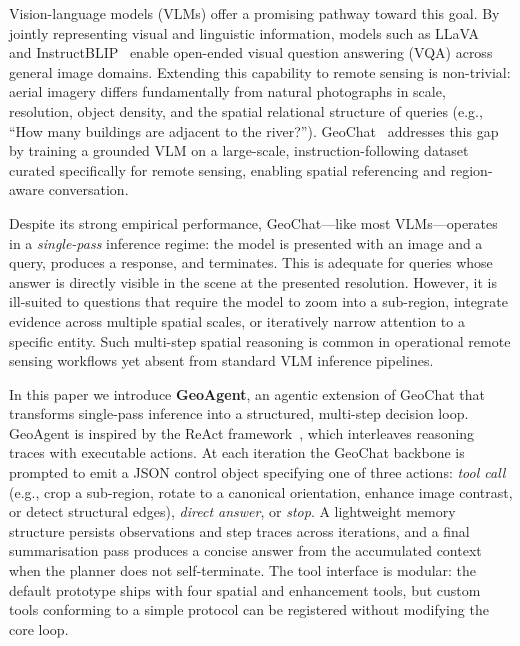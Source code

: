 \documentclass{article}
\begin{document}
Vision-language models (VLMs) offer a promising pathway toward this goal.  By
jointly representing visual and linguistic information, models such as
LLaVA~\citep{liu2023llava} and InstructBLIP~\citep{dai2023instructblip} enable
open-ended visual question answering (VQA) across general image domains.  Extending
this capability to remote sensing is non-trivial: aerial imagery differs
fundamentally from natural photographs in scale, resolution, object density, and
the spatial relational structure of queries (e.g., ``How many buildings are
adjacent to the river?'').  GeoChat~\citep{kuckreja2024geochat} addresses this gap
by training a grounded VLM on a large-scale, instruction-following dataset curated
specifically for remote sensing, enabling spatial referencing and region-aware
conversation.

Despite its strong empirical performance, GeoChat---like most VLMs---operates in a
\emph{single-pass} inference regime: the model is presented with an image and a
query, produces a response, and terminates.  This is adequate for queries whose
answer is directly visible in the scene at the presented resolution.  However, it
is ill-suited to questions that require the model to zoom into a sub-region,
integrate evidence across multiple spatial scales, or iteratively narrow attention
to a specific entity.  Such multi-step spatial reasoning is common in operational
remote sensing workflows yet absent from standard VLM inference pipelines.

In this paper we introduce \textbf{GeoAgent}, an agentic extension of GeoChat that
transforms single-pass inference into a structured, multi-step decision loop.
GeoAgent is inspired by the ReAct framework~\citep{yao2023react}, which interleaves
reasoning traces with executable actions.  At each iteration the GeoChat backbone
is prompted to emit a JSON control object specifying one of three actions:
\textit{tool call} (e.g., crop a sub-region, rotate to a canonical orientation,
enhance image contrast, or detect structural edges), \textit{direct answer}, or
\textit{stop}.  A lightweight memory structure persists observations and step traces
across iterations, and a final summarisation pass produces a concise answer from the
accumulated context when the planner does not self-terminate.  The tool interface is
modular: the default prototype ships with four spatial and enhancement tools, but
custom tools conforming to a simple protocol can be registered without modifying the
core loop.
\end{document}
